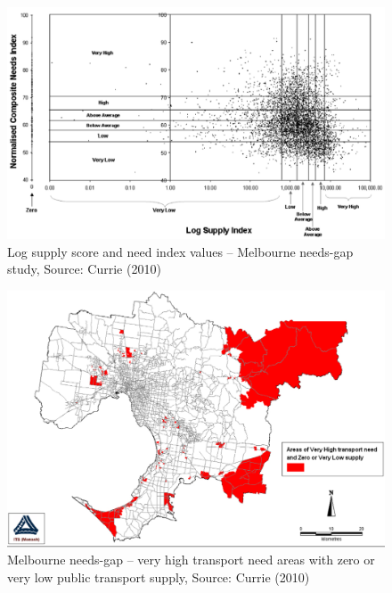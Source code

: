 \documentclass[preprint, 3p,
authoryear]{elsarticle} %
\begin{document}
\begin{figure}
\includegraphics[width=1\linewidth]{graphics/Currie2010chart} \caption{Log supply score and need index values – Melbourne needs-gap study, Source: Currie (2010)}\label{fig:Currie_chart_gap}
\end{figure}

\begin{figure}
\includegraphics[width=1\linewidth]{graphics/Currie2010gap} \caption{Melbourne needs-gap – very high transport need areas with zero or very low public transport supply, Source: Currie (2010)}\label{fig:Currie_map_gap}
\end{figure}
\end{document}
